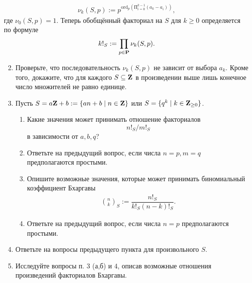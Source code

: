 \begin{align*}
\nu_k(S,p) := p^{\text{ord}_p\left( \text{П}_{i = 0}^{k-1} (a_k - a_i)\right)},
\end{align*}
где $\nu_0(S,p) = 1.$ Теперь обобщённый факториал на $S$ для $k \geq 0$ определяется по формуле
\begin{align*}
k!_S := \prod_{p \in \text{\bfseries P}} \nu_k(S,p).
\end{align*}
\begin{enumerate} \setcounter{enumi}{1}
\item Проверьте, что последовательность $\nu_k(S,p)$ не зависит от выбора $a_k$. Кроме того, докажите, что для каждого $S \subseteq \text{\bfseries Z}$ в произведении выше лишь конечное число множителей не равно единице.
\item Пусть $S = a\text{\bfseries Z} + b := \{an + b \mid n \in \text{\bfseries Z}\}$ или $S = \{q^k \mid k \in \text{\bfseries Z}_{\geq 0}\}$. 
\begin{enumerate}
\item Какие значения может принимать отношение факториалов
	$$n!_S/m!_S$$
в зависимости от $a,b,q$?
\item Ответьте на предыдущий вопрос, если числа $n = p, m = q$ предполагаются простыми.
\item Опишите возможные значения, которые может принимать биномиальный коэффициент Бхаргавы
\begin{align*}
\binom{n}{k}_S := \dfrac{n!_S}{k!_S (n-k)!_S}.
\end{align*}
\item Ответьте на предыдущий вопрос, если числа $n = p$ предполагаются простыми.
\end{enumerate}

\item Ответьте на вопросы предыдущего пункта для произвольного $S.$

\item Исследуйте вопросы п. $3$ (а,б) и $4$, описав возможные отношения произведений факториалов Бхаргавы.
\end{enumerate}